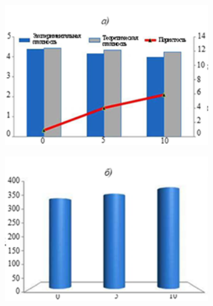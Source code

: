 \begin{figure}[H]
	\centering
	\includegraphics[width=0.8\textwidth]{media/chem/image6}
	\caption*{}
\end{figure}

\begin{figure}[H]
	\centering
	\includegraphics[width=0.8\textwidth]{media/chem/image7}
	\caption*{}
\end{figure}

